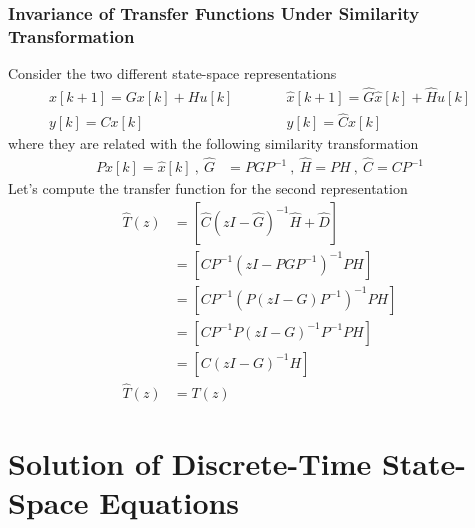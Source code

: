 \documentclass[twoside]{article}
\begin{document}
\subsubsection*{Invariance of Transfer Functions Under Similarity
  Transformation}

Consider the two different state-space representations
%
\begin{align*}
  x[k+1] = G x[k] + H u[k]  \quad & \quad \quad \hat{x}[k+1] = \hat{G} \hat{x}[k] + \hat{H} u[k] 
\\
  y[k] = C x[k] \quad & \quad \quad  y[k] = \hat{C} x[k] 
\end{align*}
%
where they are related with the following similarity transformation
%
\begin{align*}
P x[k] = \hat{x}[k] \ , \
\hat{G} &= P  G P^{-1} \ , \ \hat{H} = P  H \ , \ \hat{C} = C P^{-1} 
\end{align*}
%
Let's compute the transfer function for the second representation
%
\begin{align*}
  \hat{T}(z) &= \left[ \hat{C} \left(z I - \hat{G} \right)^{-1} \hat{H}
  + \hat{D} \right]
\\
&= \left[ C P^{-1} \left(z I - P  G P^{-1} \right)^{-1} P H \right]
\\
&= \left[ C P^{-1} \left( P \left( z I -   G \right) P^{-1}
  \right)^{-1} P H \right]
\\
&= \left[ C P^{-1} P \left( z I -   G \right)^{-1} P^{-1} P H \right]
\\
&= \left[ C \left( z I -   G \right)^{-1} H \right]
\\
\hat{T}(z) &= T(z)
\end{align*}



\section{Solution of Discrete-Time State-Space Equations}
\end{document}
